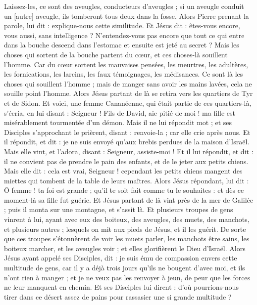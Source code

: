 \begin{multicols}{2}
Laissez-les, ce sont des aveugles, conducteurs d'aveugles ; si un aveugle conduit un [autre] aveugle, ils tomberont tous deux dans la fosse.
Alors Pierre prenant la parole, lui dit : explique-nous cette similitude.
Et Jésus dit : êtes-vous encore, vous aussi, sans intelligence ?
N'entendez-vous pas encore que tout ce qui entre dans la bouche descend dans l'estomac et ensuite est jeté au secret ?
Mais les choses qui sortent de la bouche partent du cœur, et ces choses-là souillent l'homme.
Car du cœur sortent les mauvaises pensées, les meurtres, les adultères, les fornications, les larcins, les faux témoignages, les médisances.
Ce sont là les choses qui souillent l'homme ; mais de manger sans avoir les mains lavées, cela ne souille point l'homme.
Alors Jésus partant de là se retira vers les quartiers de Tyr et de Sidon.
Et voici, une femme Cananéenne, qui était partie de ces quartiers-là, s'écria, en lui disant : Seigneur ! Fils de David, aie pitié de moi ! ma fille est misérablement tourmentée d'un démon.
Mais il ne lui répondit mot ; et ses Disciples s'approchant le prièrent, disant : renvoie-la ; car elle crie après nous.
Et il répondit, et dit : je ne suis envoyé qu'aux brebis perdues de la maison d'Israël.
Mais elle vint, et l'adora, disant : Seigneur, assiste-moi !
Et il lui répondit, et dit : il ne convient pas de prendre le pain des enfants, et de le jeter aux petits chiens.
Mais elle dit : cela est vrai, Seigneur ! cependant les petits chiens mangent des miettes qui tombent de la table de leurs maîtres.
Alors Jésus répondant, lui dit : Ô femme ! ta foi est grande ; qu'il te soit fait comme tu le souhaites : et dès ce moment-là sa fille fut guérie.
Et Jésus partant de là vint près de la mer de Galilée ; puis il monta sur une montagne, et s'assit là.
Et plusieurs troupes de gens vinrent à lui, ayant avec eux des boiteux, des aveugles, des muets, des manchots, et plusieurs autres ; lesquels on mit aux pieds de Jésus, et il les guérit.
De sorte que ces troupes s'étonnèrent de voir les muets parler, les manchots être sains, les boiteux marcher, et les aveugles voir ; et elles glorifièrent le Dieu d'Israël.
Alors Jésus ayant appelé ses Disciples, dit : je suis ému de compassion envers cette multitude de gens, car il y a déjà trois jours qu'ils ne bougent d'avec moi, et ils n'ont rien à manger ; et je ne veux pas les renvoyer à jeun, de peur que les forces ne leur manquent en chemin.
Et ses Disciples lui dirent : d'où pourrions-nous tirer dans ce désert assez de pains pour rassasier une si grande multitude ?

\end{multicols}
